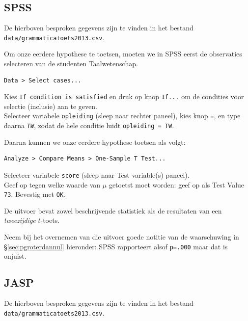 \documentclass[
]{book}
\begin{document}
\hypertarget{spss-10}{%
\subsection{SPSS}\label{spss-10}}

De hierboven besproken gegevens zijn te vinden in het bestand \texttt{data/grammaticatoets2013.csv}.

Om onze eerdere hypothese te toetsen, moeten we in SPSS eerst de
observaties selecteren van de studenten Taalwetenschap.

\begin{verbatim}
Data > Select cases...
\end{verbatim}

Kies \texttt{If\ condition\ is\ satisfied} en druk op knop \texttt{If...} om de condities
voor selectie (inclusie) aan te geven.\\
Selecteer variabele \texttt{opleiding} (sleep naar rechter paneel), kies knop
\texttt{=}, en type daarna \emph{\texttt{TW}}, zodat de hele conditie luidt
\texttt{opleiding\ =\ TW}.

Daarna kunnen we onze eerdere hypothese toetsen als volgt:

\begin{verbatim}
Analyze > Compare Means > One-Sample T Test...
\end{verbatim}

Selecteer variabele \texttt{score} (sleep naar Test variable(s) paneel).\\
Geef op tegen welke waarde van \(\mu\) getoetst moet worden: geef op als
Test Value \texttt{73}. Bevestig met \texttt{OK}.

De uitvoer bevat zowel beschrijvende statistiek als de resultaten van
een \emph{tweezijdige} \(t\)-toets.

Neem bij het overnemen van die uitvoer goede notitie van de waarschuwing in
§\ref{sec:pgroterdannul} hieronder: SPSS rapporteert alsof \texttt{p=.000} maar dat is onjuist.

\hypertarget{sec:jaspttoetsenkel}{%
\subsection{JASP}\label{sec:jaspttoetsenkel}}

De hierboven besproken gegevens zijn te vinden in het bestand \texttt{data/grammaticatoets2013.csv}.
\end{document}
